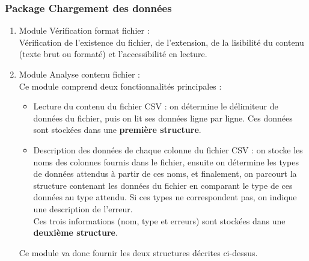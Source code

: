 			\subsubsection*{Package Chargement des données}
			\begin{enumerate}
				\item Module Vérification format fichier :\\
				Vérification de l'existence du fichier, de l'extension, de la lisibilité du contenu (texte brut ou formaté) et l'accessibilité en lecture.
				\item Module Analyse contenu fichier :\\
				Ce module comprend deux fonctionnalités principales :
				\begin{itemize}[leftmargin=*]
					\item Lecture du contenu du fichier CSV : on détermine le délimiteur de données du fichier, puis on lit ses données ligne par ligne. Ces données sont stockées dans une \textbf{première structure}.
					\item Description des données de chaque colonne du fichier CSV : on stocke les noms des colonnes fournis dans le fichier, ensuite on détermine les types de données attendus à partir de ces noms, et finalement, on parcourt la structure contenant les données du fichier en comparant le type de ces données au type attendu. Si ces types ne correspondent pas, on indique une description de l'erreur.\\
					Ces trois informations (nom, type et erreurs) sont stockées dans une \textbf{deuxième structure}.
				\end{itemize}
				Ce module va donc fournir les deux structures décrites ci-dessus.
			\end{enumerate}
			
